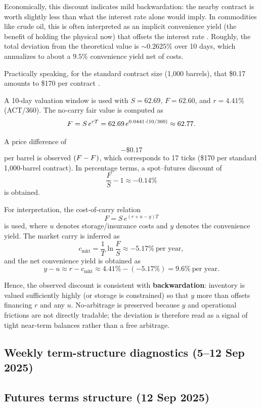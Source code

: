 \documentclass[10pt,a4paper]{article} %
\begin{document}
Economically, this discount indicates mild backwardation: the nearby contract is worth slightly less than what the interest rate alone would imply. In commodities like crude oil, this is often interpreted as an implicit convenience yield (the benefit of holding the physical now) that offsets the interest rate \citep{kaldor_working_brennan, eia_backwardation_2013, milonas_convenience_2024}. Roughly, the total deviation from the theoretical value is $\sim 0.2625\%$ over 10 days, which annualizes to about a $9.5\%$ convenience yield net of costs.

Practically speaking, for the standard contract size (1{,}000 barrels), that \$0.17 amounts to \$170 per contract \citep{cme_cl_specs}.


A 10-day valuation window is used with $S=62.69$, $F=62.60$, and $r=4.41\%$ (ACT/360). The no-carry fair value is computed as
\[
F^{\*}=S\,e^{rT}=62.69\,e^{0.0441\cdot(10/360)}\approx62.77.
\]

A price difference of
\[
-\$0.17
\]
per barrel is observed $(F-F^{\*})$, which corresponds to 17 ticks (\$170 per standard 1,000-barrel contract). In percentage terms, a spot–futures discount of
\[
\frac{F}{S}-1 \approx -0.14\%
\]
is obtained.

For interpretation, the cost-of-carry relation
\[
F=S\,e^{(r+u-y)T}
\]
is used, where $u$ denotes storage/insurance costs and $y$ denotes the convenience yield. The market carry is inferred as
\[
c_{\text{mkt}}=\frac{1}{T}\ln\!\frac{F}{S}\approx-5.17\%\ \text{per year},
\]
and the net convenience yield is obtained as
\[
y-u \approx r-c_{\text{mkt}}\approx 4.41\%-(-5.17\%)=9.6\% \ \text{per year}.
\]

Hence, the observed discount is consistent with \textbf{backwardation}: inventory is valued sufficiently highly (or storage is constrained) so that $y$ more than offsets financing $r$ and any $u$. No-arbitrage is preserved because $y$ and operational frictions are not directly tradable; the deviation is therefore read as a signal of tight near-term balances rather than a free arbitrage.

\subsection{Weekly term-structure diagnostics (5–12 Sep 2025)}


\subsection{Futures terms structure (12 Sep 2025)}
\end{document}
